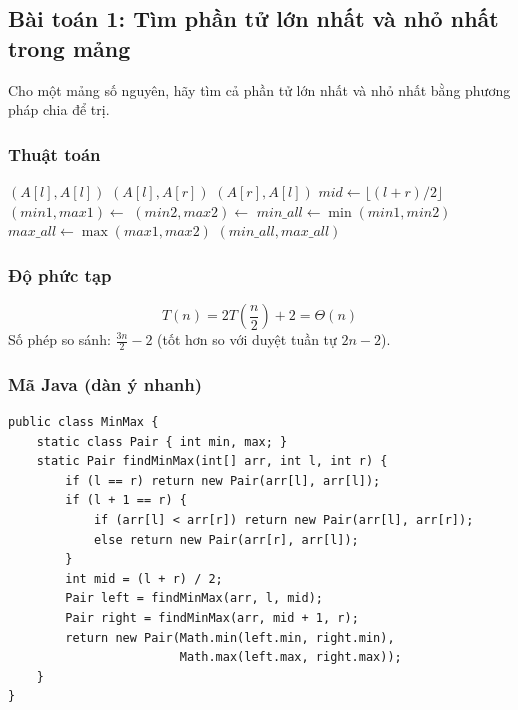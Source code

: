 \documentclass{article}
\begin{document}
\subsection{Bài toán 1: Tìm phần tử lớn nhất và nhỏ nhất trong mảng}

Cho một mảng số nguyên, hãy tìm cả phần tử lớn nhất và nhỏ nhất bằng phương pháp chia để trị.

\subsubsection{Thuật toán}

\begin{algorithmic}[1]
        \State \Return $(A[l], A[l])$
            \State \Return $(A[l], A[r])$
        \Else
            \State \Return $(A[r], A[l])$
        \EndIf
    \Else
        \State $mid \gets \lfloor (l+r)/2 \rfloor$
        \State $(min1, max1) \gets$ 
        \State $(min2, max2) \gets$ 
        \State $min\_all \gets \min(min1, min2)$
        \State $max\_all \gets \max(max1, max2)$
        \State \Return $(min\_all, max\_all)$
    \EndIf
\EndFunction
\end{algorithmic}

\subsubsection{Độ phức tạp}
\[
T(n) = 2T\left(\frac{n}{2}\right) + 2 = \Theta(n)
\]
Số phép so sánh: \(\frac{3n}{2} - 2\) (tốt hơn so với duyệt tuần tự \(2n-2\)).

\subsubsection{Mã Java (dàn ý nhanh)}
\begin{verbatim}
public class MinMax {
    static class Pair { int min, max; }
    static Pair findMinMax(int[] arr, int l, int r) {
        if (l == r) return new Pair(arr[l], arr[l]);
        if (l + 1 == r) {
            if (arr[l] < arr[r]) return new Pair(arr[l], arr[r]);
            else return new Pair(arr[r], arr[l]);
        }
        int mid = (l + r) / 2;
        Pair left = findMinMax(arr, l, mid);
        Pair right = findMinMax(arr, mid + 1, r);
        return new Pair(Math.min(left.min, right.min), 
                        Math.max(left.max, right.max));
    }
}
\end{verbatim}
\end{document}
